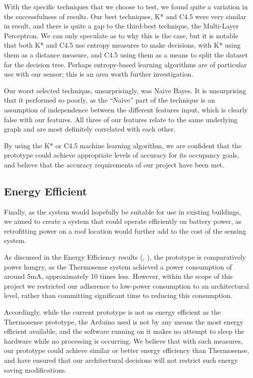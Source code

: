 \documentclass[../thesis/thesis.tex]{subfiles}
\begin{document}
With the specific techniques that we choose to test, we found quite a variation in the successfulness of results. Our best techniques, K* and C4.5 were very similar in result, and there is quite a gap to the third-best technique, the Multi-Layer Perceptron. We can only speculate as to why this is the case, but it is notable that both K* and C4.5 use entropy measures to make decisions, with K* using them as a distance measure, and C4.5 using them as a means to split the dataset for the decision tree. Perhaps entropy-based learning algorithms are of particular use with our sensor; this is an area worth further investigation.

Our worst selected technique, unsurprisingly, was Naive Bayes. It is unsurprising that it performed so poorly, as the ``Naive'' part of the technique is an assumption of independence between the different features input, which is clearly false with our features. All three of our features relate to the same underlying graph and are most definitely correlated with each other.

By using the K* or C4.5 machine learning algorithm, we are confident that the prototype could achieve appropriate levels of accuracy for its occupancy goals, and believe that the accuracy requirements of our project have been met.

\subsection{Energy Efficient}
Finally, as the system would hopefully be suitable for use in existing buildings, we aimed to create a system that could operate efficiently on battery power, as retrofitting power on a roof location would further add to the cost of the sensing system.

As discussed in the Energy Efficiency results (, ), the prototype is comparatively power hungry, as the Thermosense system achieved a power consumption of around 5mA, approximately 10 times less. However, within the scope of this project we restricted our adherence to low-power consumption to an architectural level, rather than committing significant time to reducing this consumption.

Accordingly, while the current prototype is not as energy efficient as the Thermosense prototype, the Arduino used is not by any means the most energy efficient available, and the software running on it makes no attempt to sleep the hardware while no processing is occurring. We believe that with such measures, our prototype could achieve similar or better energy efficiency than Thermosense, and have ensured that our architectural decisions will not restrict such energy saving modifications.
\end{document}
